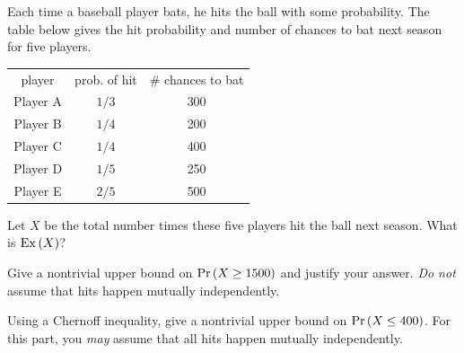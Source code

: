\documentclass[12pt,oneside]{article}
\begin{document}

\newpage

\begin{problem}[12 points]
Each time a baseball player bats, he hits the ball with some
probability.  The table below gives the hit probability and number of
chances to bat next season for five players.
%
\begin{center}
\begin{tabular}{ccc}
player & prob. of hit & \# chances to bat \\[0.5ex]
Player A & $1/3$ & 300 \\
Player B & $1/4$ & 200 \\
Player C & $1/4$ & 400 \\
Player D & $1/5$ & 250 \\
Player E & $2/5$ & 500
\end{tabular}
\end{center}
\bparts

\ppart Let $X$ be the total number times these five players hit the
ball next season.  What is $\operatorname{Ex}\left(X\right)$?


\ppart Give a nontrivial upper bound on $\Pr\left(X \geq 1500\right)$ and justify
your answer.  \textit{Do not} assume that hits happen mutually
independently.


\ppart Using a Chernoff inequality, give a nontrivial upper bound on
$\Pr\left(X \leq 400\right)$.  For this part, you \textit{may} assume that all
hits happen mutually independently.


\eparts

\end{problem}

%
\end{document}
